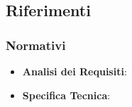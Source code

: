 	\subsection{Riferimenti} %
	\label{sub:riferimenti}

		\subsubsection{Normativi} %
		\label{ssub:normativi}
			\begin{itemize}
				\item \textbf{Analisi dei Requisiti}: \docNameVersionAdR
				\item \textbf{Specifica Tecnica}: \docNameVersionST
			\end{itemize}



